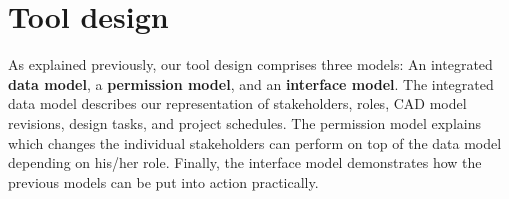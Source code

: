 \section{Tool design}
\label{sec:contribution}

As explained previously, our tool design comprises three models: An integrated \textbf{data model}, a \textbf{permission model}, and an \textbf{interface model}.
The integrated data model describes our representation of stakeholders, roles, CAD model revisions, design tasks, and project schedules.
The permission model explains which changes the individual stakeholders can perform on top of the data model depending on his/her role.
Finally, the interface model demonstrates how the previous models can be put into action practically.



